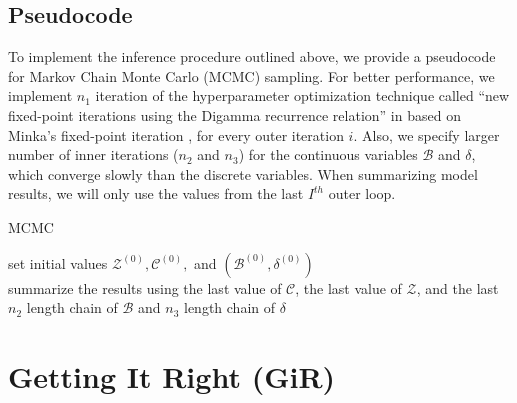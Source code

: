\documentclass[a4paper]{article}
\begin{document}
 \subsection{Pseudocode}  \label{subsec: Pseudocode}
 To implement the inference procedure outlined above, we provide a pseudocode for Markov Chain Monte Carlo (MCMC) sampling. For better performance, we implement $n_1$ iteration of the hyperparameter optimization technique called ``new fixed-point iterations using the Digamma recurrence relation'' in \cite{wallach2008structured} based on Minka’s fixed-point iteration \citep{minka2000estimating}, for every outer iteration $i$. Also, we specify larger number of inner iterations ($n_2$ and $n_3$) for the continuous variables $\mathcal{B}$ and $\delta$, which converge slowly than the discrete variables. When summarizing model results, we will only use the values from the last $I^{th}$ outer loop.
 \begin{algorithm}[H]
 	\SetAlgoLined
 	\caption{MCMC}
 	set initial values $\mathcal{Z}^{(0)}, \mathcal{C}^{(0)}, $ and $(\mathcal{B}^{(0)}, \delta^{(0)})$\\
 		summarize the results using the last value of $\mathcal{C}$, the last value of $\mathcal{Z}$, and the last $n_2$ length chain of $\mathcal{B}$ and $n_3$ length chain of $\delta$ 
 \end{algorithm}
   \section{Getting It Right (GiR)}
\end{document}
